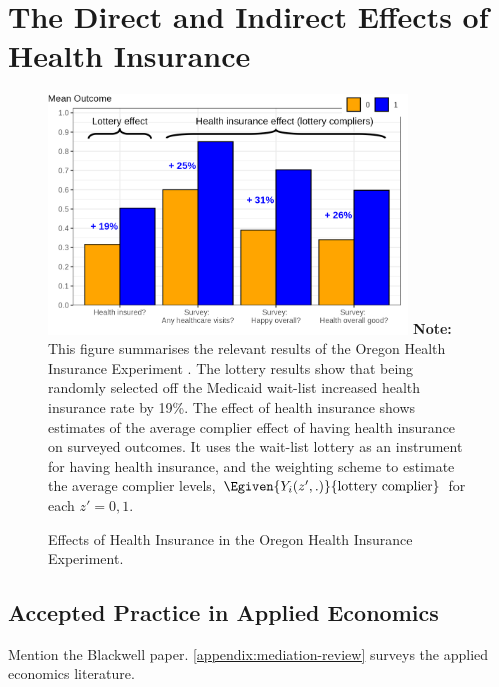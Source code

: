 \section{The Direct and Indirect Effects of Health Insurance}
\label{sec:healthinsurance}


\begin{figure}[h!]
    \caption{Effects of Health Insurance in the Oregon Health Insurance Experiment.}
    \centering
    \includegraphics[width=0.85\textwidth]{sections/figures/insurance-effects.png}
    \label{fig:healthinsurance-effects}
    \justify
    \footnotesize    
    \textbf{Note:}
    This figure summarises the relevant results of the Oregon Health Insurance Experiment \citep{finkelstein2008oregon}.
    The lottery results show that being randomly selected off the Medicaid wait-list increased health insurance rate by 19\%.
    The effect of health insurance shows estimates of the average complier effect of having health insurance on surveyed outcomes.
    It uses the wait-list lottery as an instrument for having health insurance, and the \cite{abadie2003semiparametric} weighting scheme to estimate the average complier levels, $\Egiven{Y_i(z',.)}{\text{lottery complier}}$ for each $z'=0,1$.
\end{figure}


\subsection{Accepted Practice in Applied Economics}

Mention the Blackwell paper.
\autoref{appendix:mediation-review} surveys the applied economics literature.
